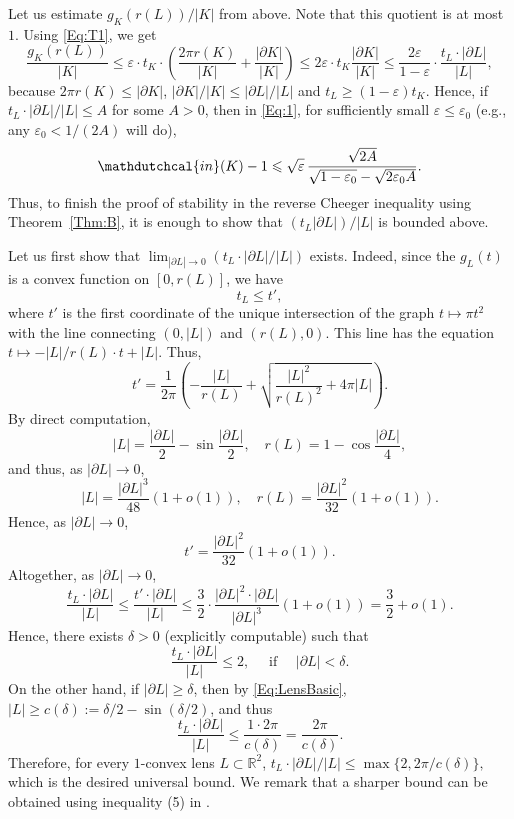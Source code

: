 \documentclass[11pt, oneside]{amsart}
\newcommand{\R}{\mathbb{R}}
\newcommand{\Rr}{\mathdutchcal{in}}
\newcommand{\eps}{\varepsilon}
\renewcommand{\ge}{\geqslant}
\renewcommand{\le}{\leqslant}
\theoremstyle{theorem}
\theoremstyle{Intro}
\theoremstyle{definition}
\theoremstyle{remark}
\theoremstyle{claim}
\numberwithin{equation}{section}
\begin{document}
Let us estimate ${g_K(r(L))}/{|K|}$ from above. Note that this quotient is at most $1$. Using \eqref{Eq:T1}, we get
\[
\frac{g_K(r(L))}{|K|} \le \eps \cdot t_K \cdot \left(\frac{2\pi r(K)}{|K|} + \frac{|\partial K|}{|K|}\right) \le 2 \eps \cdot t_K \frac{|\partial K|}{|K|} \le \frac{2 \eps}{1 - \eps} \cdot \frac{t_L \cdot |\partial L|}{|L|}, 
\]
because $2\pi r(K) \le |\partial K|$, $|\partial K|/|K| \le |\partial L|/|L|$ and $t_L \ge (1 - \eps)t_K$. Hence, if ${t_L \cdot |\partial L|}/{|L|} \le A$ for some $A > 0$, then in \eqref{Eq:1}, for sufficiently small $\eps \le \eps_0$ (e.g., any $\eps_0 < 1/(2 A)$ will do),
\[
 \Rr(K)-1 \le  \sqrt{\eps} \, \frac{\sqrt{2 A}}{\sqrt{1 - \eps_0} - \sqrt{2 \eps_0 A}}.
\]
Thus, to finish the proof of stability in the reverse Cheeger inequality using Theorem~\ref{Thm:B}, it is enough to show that $\left(t_L |\partial L|\right) / |L|$ is bounded above. 

Let us first show that $\lim_{|\partial L| \to 0} (t_L \cdot |\partial L| / |L|)$ exists. Indeed, since the $g_L(t)$ is a convex function on $[0,r(L)]$, we have 
\[
t_L \le t',
\]
where $t'$ is the first coordinate of the unique intersection of the graph $t \mapsto \pi t^2$ with the line connecting $(0, |L|)$ and $(r(L), 0)$. This line has the equation $t \mapsto -|L|/r(L) \cdot t + |L|$. Thus,
\[
t' = \frac{1}{2\pi} \left(-\frac{|L|}{r(L)} + \sqrt{\frac{|L|^2}{r(L)^2}+4\pi|L|}\right).
\]
By direct computation,
\begin{equation}
\label{Eq:LensBasic}
|L| = \frac{|\partial L|}{2} - \sin \frac{|\partial L|}{2}, \quad r(L) = 1 - \cos\frac{|\partial L|}{4}, 
\end{equation}
and thus, as $|\partial L| \to 0$,
\begin{equation}
    \label{Eq:LAss}
    |L| = \frac{|\partial L|^3}{48}\left(1 + o(1)\right), \quad r(L) = \frac{|\partial L|^2}{32}\left(1 + o(1)\right).
\end{equation}
Hence, as $|\partial L| \to 0$,
\[
t' = \frac{|\partial L|^2}{32}\left(1 + o(1)\right).
\]
Altogether, as $|\partial L| \to 0$,
\[
\frac{t_L \cdot |\partial L|}{|L|} \le \frac{t' \cdot |\partial L|}{|L|} \le \frac{3}{2} \cdot \frac{|\partial L|^2 \cdot |\partial L|}{|\partial L|^3}\left(1 + o(1)\right) = \frac{3}{2} + o(1). 
\]
Hence, there exists $\delta >0$ (explicitly computable) such that
\[
\frac{t_L \cdot |\partial L|}{|L|} \le 2, \quad \text{ if }\quad |\partial L| < \delta.
\]
On the other hand, if $|\partial L| \ge \delta$, then by \eqref{Eq:LensBasic}, $|L| \ge c(\delta) := \delta/2 - \sin(\delta/2)$, and thus 
\[
\frac{t_L \cdot |\partial L|}{|L|} \le \frac{1 \cdot 2\pi}{c(\delta)} = \frac{2\pi}{c(\delta)}.
\]
Therefore, for every $1$-convex lens $L \subset \R^2$,
$
{t_L \cdot |\partial L|}/{|L|} \le \max\{2, {2\pi}/{c(\delta)}\},
$
which is the desired universal bound. We remark that a sharper bound can be obtained using inequality (5) in \cite{Ftohi}.
\end{document}
